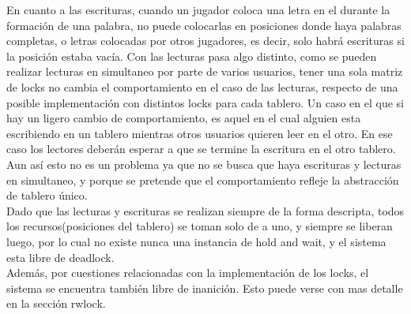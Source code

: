  En cuanto a las escrituras,  cuando un jugador coloca una letra en el durante la formación de una palabra, no puede colocarlas en posiciones donde haya palabras completas, o letras colocadas por otros jugadores, es decir, solo habrá escrituras si la posición estaba vacía. Con las lecturas pasa algo distinto, como se pueden realizar lecturas en simultaneo por parte de varios usuarios, tener una sola matriz de locks no cambia el comportamiento en el caso de las lecturas, respecto de una posible implementación con distintos locks para cada tablero. Un caso en el que si hay un ligero cambio de comportamiento, es aquel en el cual alguien esta escribiendo en un tablero mientras otros usuarios quieren leer en el otro. En ese caso los lectores deberán esperar a que se termine la escritura en el otro tablero. Aun así esto no es un problema ya que no se busca que haya escrituras y lecturas en simultaneo, y porque se pretende que el comportamiento refleje la abstracción de tablero único.\\
Dado que las lecturas y escrituras se realizan siempre de la forma descripta, todos los recursos(posiciones del tablero) se toman solo de a uno, y siempre se liberan luego, por lo cual no existe nunca una instancia de hold and wait, y el sistema esta libre de deadlock.\\ Además, por cuestiones relacionadas con la implementación de los locks, el sistema se encuentra también libre de inanición. Esto puede verse con mas detalle en la sección rwlock.
\\
\\

